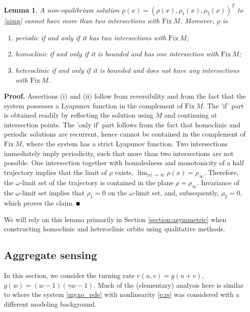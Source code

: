 \documentclass[10pt]{article}
\newtheorem{Lemma}{Lemma}[section]
\newenvironment{Proof}%
 {\begin{trivlist} \item[]{\bf Proof. }}%
 {\hspace*{\fill}$\rule{.4\baselineskip}{.4\baselineskip}$\end{trivlist}}
\begin{document}
\begin{Lemma}\label{lemma:symmetry}  A non-equilibrium solution $\underline{\rho}(x) = (\rho(x),\rho_1(x),\rho_2(x))^T$ to \eqref{simp} cannot have more than two intersections with $\text{Fix}\ M$.  Moreover, $\underline{\rho}$ is 
\begin{enumerate}
 \item periodic if and only if it has two intersections with $\text{Fix}\ M$;
 \item homoclinic if and only if it is bounded and has one intersection with $\text{Fix}\ M$;
 \item heteroclinic if and only if it is bounded and does not have any intersections with $\text{Fix}\ M$.
\end{enumerate}
\end{Lemma}
\begin{Proof}
Assertions (i) and (ii) follow from reversibility and  from the fact that the system possesses a Lyapunov function in the complement of $\text{Fix}\ M$. The 'if' part is obtained readily by reflecting the solution using $M$ and continuing at intersection points. The 'only if' part follows from the fact that homoclinic and periodic solutions are recurrent, hence cannot be contained in the complement of $\text{Fix}\ M$, where the system has a strict Lyapunov function. Two intersections immediately imply periodicity, such that more than two intersections are not possible. One intersection together with boundedness and monotonicity of a half trajectory implies that the limit of $\rho$ exists, 
$\lim_{|x|\to\infty}\rho(x)=\rho_\infty$. Therefore, the $\omega$-limit set of the trajectory is contained in the plane $\rho=\rho_\infty$. Invariance of the $\omega$-limit set implies that $\rho_1=0$ on the $\omega$-limit set, and, subsequently, $\rho_2=0$, which proves the claim.
\end{Proof}
We will rely on this lemma primarily in Section \ref{section:asymmetric} when constructing homoclinic and heteroclinic orbits using qualitative methods. 


\subsection{Aggregate sensing}\label{section:simplified}
In this section, we consider the turning rate  $r(u,v) = g(u+v)$, $g(w)=(w-1)(\gamma w-1)$. Much of the (elementary) analysis here is similar to \cite{fuhrmann} where the system \eqref{myxo_pde} with nonlinearity \eqref{e:rs} was considered with a different modeling background. 
\end{document}

